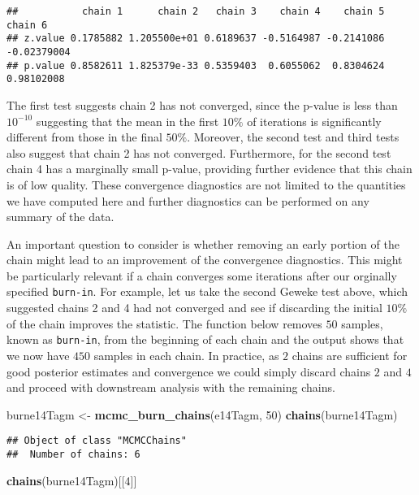 \documentclass[]{article}
\newenvironment{Shaded}{\begin{snugshade}}{\end{snugshade}}
\newcommand{\KeywordTok}[1]{\textcolor[rgb]{0.13,0.29,0.53}{\textbf{{#1}}}}
\newcommand{\DecValTok}[1]{\textcolor[rgb]{0.00,0.00,0.81}{{#1}}}
\newcommand{\StringTok}[1]{\textcolor[rgb]{0.31,0.60,0.02}{{#1}}}
\newcommand{\NormalTok}[1]{{#1}}
\begin{document}
\begin{verbatim}
##           chain 1      chain 2   chain 3    chain 4    chain 5     chain 6
## z.value 0.1785882 1.205500e+01 0.6189637 -0.5164987 -0.2141086 -0.02379004
## p.value 0.8582611 1.825379e-33 0.5359403  0.6055062  0.8304624  0.98102008
\end{verbatim}

The first test suggests chain 2 has not converged, since the p-value is
less than \(10^{-10}\) suggesting that the mean in the first \(10\%\) of
iterations is significantly different from those in the final \(50\%\).
Moreover, the second test and third tests also suggest that chain 2 has
not converged. Furthermore, for the second test chain 4 has a marginally
small p-value, providing further evidence that this chain is of low
quality. These convergence diagnostics are not limited to the quantities
we have computed here and further diagnostics can be performed on any
summary of the data.

An important question to consider is whether removing an early portion
of the chain might lead to an improvement of the convergence
diagnostics. This might be particularly relevant if a chain converges
some iterations after our orginally specified \texttt{burn-in}. For
example, let us take the second Geweke test above, which suggested
chains 2 and 4 had not converged and see if discarding the initial
\(10\%\) of the chain improves the statistic. The function below removes
\(50\) samples, known as \texttt{burn-in}, from the beginning of each
chain and the output shows that we now have \(450\) samples in each
chain. In practice, as \(2\) chains are sufficient for good posterior
estimates and convergence we could simply discard chains \(2\) and \(4\)
and proceed with downstream analysis with the remaining chains.

\begin{Shaded}
\begin{Highlighting}[]
\NormalTok{burne14Tagm <-}\StringTok{ }\KeywordTok{mcmc_burn_chains}\NormalTok{(e14Tagm, }\DecValTok{50}\NormalTok{)}
\KeywordTok{chains}\NormalTok{(burne14Tagm)}
\end{Highlighting}
\end{Shaded}

\begin{verbatim}
## Object of class "MCMCChains"
##  Number of chains: 6
\end{verbatim}

\begin{Shaded}
\begin{Highlighting}[]
\KeywordTok{chains}\NormalTok{(burne14Tagm)[[}\DecValTok{4}\NormalTok{]]}
\end{Highlighting}
\end{Shaded}
\end{document}
